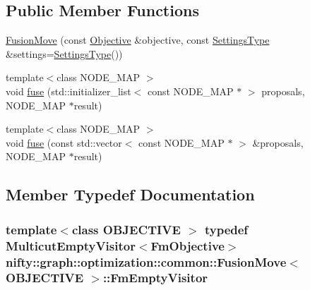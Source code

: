 \subsection*{Public Member Functions}
\begin{DoxyCompactItemize}
\item 
\hyperlink{classnifty_1_1graph_1_1optimization_1_1common_1_1FusionMove_a93704eb4dec01b5fb67518112f256438}{Fusion\+Move} (const \hyperlink{classnifty_1_1graph_1_1optimization_1_1common_1_1FusionMove_a2d9b8d0416bdb17557df7bafbac7d792}{Objective} \&objective, const \hyperlink{structnifty_1_1graph_1_1optimization_1_1common_1_1FusionMove_1_1SettingsType}{Settings\+Type} \&settings=\hyperlink{structnifty_1_1graph_1_1optimization_1_1common_1_1FusionMove_1_1SettingsType}{Settings\+Type}())
\item 
{\footnotesize template$<$class N\+O\+D\+E\+\_\+\+M\+A\+P $>$ }\\void \hyperlink{classnifty_1_1graph_1_1optimization_1_1common_1_1FusionMove_ae766668feb7fe7e9e1afa78c0f65c0d7}{fuse} (std\+::initializer\+\_\+list$<$ const N\+O\+D\+E\+\_\+\+M\+A\+P $\ast$ $>$ proposals, N\+O\+D\+E\+\_\+\+M\+A\+P $\ast$result)
\item 
{\footnotesize template$<$class N\+O\+D\+E\+\_\+\+M\+A\+P $>$ }\\void \hyperlink{classnifty_1_1graph_1_1optimization_1_1common_1_1FusionMove_a2decb17ee1de3751de741802278f3050}{fuse} (const std\+::vector$<$ const N\+O\+D\+E\+\_\+\+M\+A\+P $\ast$ $>$ \&proposals, N\+O\+D\+E\+\_\+\+M\+A\+P $\ast$result)
\end{DoxyCompactItemize}


\subsection{Member Typedef Documentation}
\hypertarget{classnifty_1_1graph_1_1optimization_1_1common_1_1FusionMove_a1f340052bf0329363ef6513d2216d0bf}{}
\subsubsection[{Fm\+Empty\+Visitor}]{\setlength{\rightskip}{0pt plus 5cm}template$<$class O\+B\+J\+E\+C\+T\+I\+V\+E $>$ typedef Multicut\+Empty\+Visitor$<${\bf Fm\+Objective}$>$ {\bf nifty\+::graph\+::optimization\+::common\+::\+Fusion\+Move}$<$ O\+B\+J\+E\+C\+T\+I\+V\+E $>$\+::{\bf Fm\+Empty\+Visitor}}\label{classnifty_1_1graph_1_1optimization_1_1common_1_1FusionMove_a1f340052bf0329363ef6513d2216d0bf}
\hypertarget{classnifty_1_1graph_1_1optimization_1_1common_1_1FusionMove_ab601d24bfed6306838a770dd33bc8d20}{}
